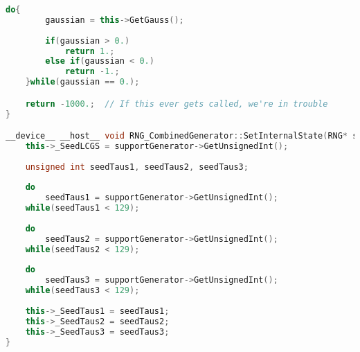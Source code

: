 \begin{lstlisting}[language=C++, caption={\texttt{libraries/CoreLibraries/RandomGenerator/RNG.cu}}]
	do{
		gaussian = this->GetGauss();
		
		if(gaussian > 0.)
			return 1.;
		else if(gaussian < 0.)
			return -1.;
	}while(gaussian == 0.);

	return -1000.;	// If this ever gets called, we're in trouble
}

__device__ __host__ void RNG_CombinedGenerator::SetInternalState(RNG* supportGenerator){
	this->_SeedLCGS = supportGenerator->GetUnsignedInt();
	
	unsigned int seedTaus1, seedTaus2, seedTaus3;
	
	do
		seedTaus1 = supportGenerator->GetUnsignedInt();
	while(seedTaus1 < 129);
	
	do
		seedTaus2 = supportGenerator->GetUnsignedInt();
	while(seedTaus2 < 129);
	
	do
		seedTaus3 = supportGenerator->GetUnsignedInt();
	while(seedTaus3 < 129);
	
	this->_SeedTaus1 = seedTaus1;
	this->_SeedTaus2 = seedTaus2;
	this->_SeedTaus3 = seedTaus3;
}
\end{lstlisting}

